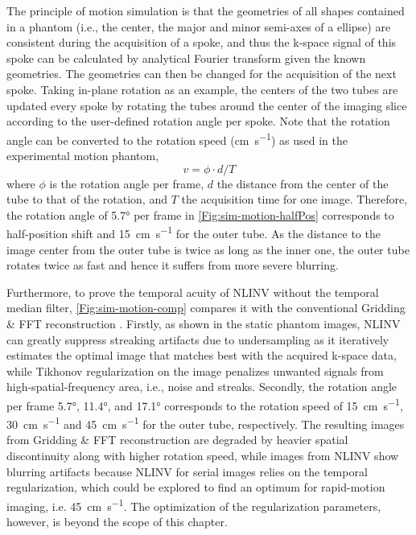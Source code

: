 The principle of motion simulation is that the geometries of all shapes contained in a phantom (i.e., the center, the major and minor semi-axes of a ellipse) are consistent during the acquisition of a spoke, and thus the k-space signal of this spoke can be calculated by analytical Fourier transform given the known geometries. The geometries can then be changed for the acquisition of the next spoke. Taking in-plane rotation as an example, the centers of the two tubes are updated every spoke by rotating the tubes around the center of the imaging slice according to the user-defined rotation angle per spoke. Note that the rotation angle can be converted to the rotation speed (\si{\cm\per\second}) as used in the experimental motion phantom,
\begin{equation} \label{Equ:rot_speed}
v = \phi \cdot d / T
\end{equation}
where $\phi$ is the rotation angle per frame, $d$ the distance from the center of the tube to that of the rotation, and $T$ the acquisition time for one image. Therefore, the rotation angle of \ang{5.7} per frame in \cref{Fig:sim-motion-halfPos} corresponds to half-position shift and \SI{15}{\cm\per\second} for the outer tube. As the distance to the image center from the outer tube is twice as long as the inner one, the outer tube rotates twice as fast and hence it suffers from more severe blurring. 

Furthermore, to prove the temporal acuity of NLINV without the temporal median filter, \cref{Fig:sim-motion-comp} compares it with the conventional Gridding \& FFT reconstruction \cite{1991_conv_gridding,2005_gridding}. Firstly, as shown in the static phantom images, NLINV can greatly suppress streaking artifacts due to undersampling as it iteratively estimates the optimal image that matches best with the acquired k-space data, while Tikhonov regularization on the image penalizes unwanted signals from high-spatial-frequency area, i.e., noise and streaks. Secondly, the rotation angle per frame \ang{5.7}, \ang{11.4}, and \ang{17.1} corresponds to the rotation speed of \SI{15}{\cm\per\second}, \SI{30}{\cm\per\second} and \SI{45}{\cm\per\second} for the outer tube, respectively. The resulting images from Gridding \& FFT reconstruction are degraded by heavier spatial discontinuity along with higher rotation speed, while images from NLINV show blurring artifacts because NLINV for serial images relies on the temporal regularization, which could be explored to find an optimum for rapid-motion imaging, i.e. \SI{45}{\cm\per\second}. The optimization of the regularization parameters, however, is beyond the scope of this chapter.

